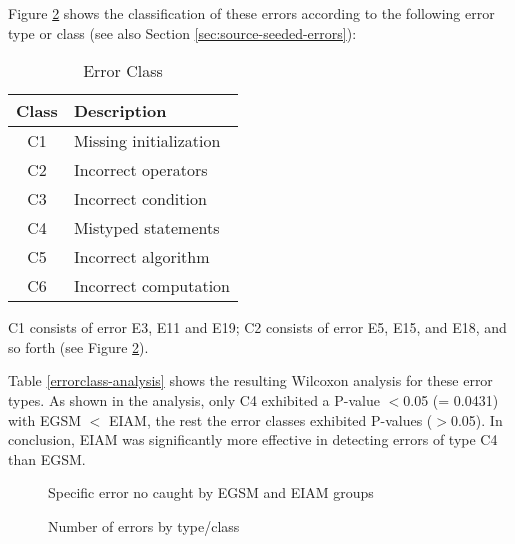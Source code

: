 Figure \ref{errorclass} shows the classification of these errors according
to the following error type or class (see also Section
\ref{sec:source-seeded-errors}):  
\begin{table}[htb]
 \caption{Error Class}
  \begin{center}
  \begin{tabular}{|c|l|}
   \hline
    Class  & Description \\
   \hline
   C1 & Missing initialization \\
   C2 & Incorrect operators \\
   C3 & Incorrect condition \\
   C4 & Mistyped statements \\
   C5 & Incorrect algorithm \\
   C6 & Incorrect computation \\
  \hline
   \end{tabular}
  \end{center}
 \label{tb:error-class}
\end{table}


C1 consists of error E3, E11 and E19; C2
consists of error E5, E15, and E18, and so forth (see Figure
\ref{errorclass}). 

Table \ref{errorclass-analysis} shows the resulting Wilcoxon 
analysis for these error types.
As shown in the analysis, only C4 exhibited a P-value $<$0.05 (=
0.0431) with EGSM $<$ EIAM, the rest the error classes exhibited P-values
($>$0.05). In conclusion, EIAM was significantly more effective in
detecting errors of type C4 than EGSM. 


\begin{figure}[htb]
 {\centerline{}}
 \caption{Specific error no caught by EGSM and EIAM groups}
 \label{errorno}
\end{figure}


\begin{figure}[htb]
 {\centerline{}}
 \caption{Number of errors by type/class} 
 \label{errorclass}
\end{figure}

